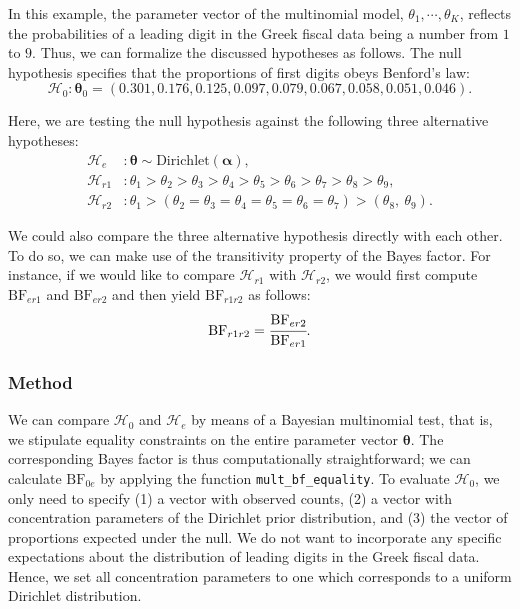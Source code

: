 \documentclass[
  english,
  man,floatsintext]{apa6}
\begin{document}
In this example, the parameter vector of the multinomial model, \(\theta_1, \cdots, \theta_K\), reflects the probabilities of a leading digit in the Greek fiscal data being a number from \(1\) to \(9\). Thus, we can formalize the discussed hypotheses as follows. The null hypothesis specifies that the proportions of first digits obeys Benford's law:
\[\mathcal{H}_0 : \boldsymbol{\theta}_0 = (0.301, 0.176, 0.125, 0.097, 0.079, 0.067, 0.058, 0.051, 0.046).\]

Here, we are testing the null hypothesis against the following three alternative hypotheses:
\begin{align*}
\mathcal{H}_e &: \boldsymbol{\theta} \sim \text{Dirichlet}(\boldsymbol{\alpha}), \\
\mathcal{H}_{r1} &: \theta_1 > \theta_2 > \theta_3 > \theta_4 > \theta_5 > \theta_6 > \theta_7 > \theta_8 > \theta_9, \\
\mathcal{H}_{r2} &:  \theta_1 > (\theta_2 = \theta_3 = \theta_4 = \theta_5 = \theta_6 = \theta_7) > (\theta_8, \ \theta_9).
\end{align*}

We could also compare the three alternative hypothesis directly with each other. To do so, we can make use of the transitivity property of the Bayes factor. For instance, if we would like to compare \(\mathcal{H}_{r1}\) with \(\mathcal{H}_{r2}\), we would first compute \(\text{BF}_{er1}\) and \(\text{BF}_{er2}\) and then yield \(\text{BF}_{r1r2}\) as follows:
\[\text{BF}_{r1r2} = \cfrac{\text{BF}_{er2}}{\text{BF}_{er1}}.\]

\hypertarget{method}{%
\subsubsection{Method}\label{method}}

We can compare \(\mathcal{H}_0\) and \(\mathcal{H}_e\) by means of a Bayesian multinomial test, that is, we stipulate equality constraints on the entire parameter vector \(\boldsymbol{\theta}\). The corresponding Bayes factor is thus computationally straightforward; we can calculate \(\text{BF}_{0e}\) by applying the function \texttt{mult\_bf\_equality}. To evaluate \(\mathcal{H}_0\), we only need to specify (1) a vector with observed counts, (2) a vector with concentration parameters of the Dirichlet prior distribution, and (3) the vector of proportions expected under the null. We do not want to incorporate any specific expectations about the distribution of leading digits in the Greek fiscal data. Hence, we set all concentration parameters to one which corresponds to a uniform Dirichlet distribution.
\end{document}
